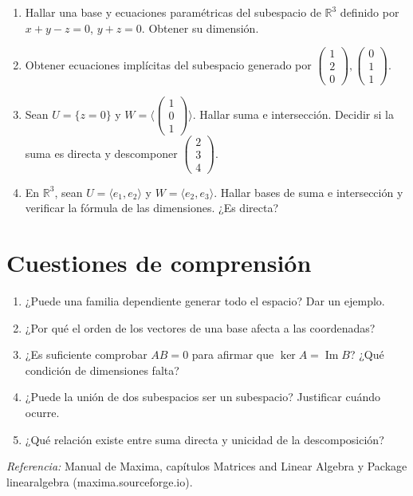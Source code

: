 \documentclass[12pt,a4paper]{article}
\begin{document}
\begin{enumerate}
\item Hallar una base y ecuaciones paramétricas del subespacio de $\mathbb R^3$ definido por $x+y-z=0$, $y+z=0$. Obtener su dimensión.
\item Obtener ecuaciones implícitas del subespacio generado por $\begin{pmatrix}1\\2\\0\end{pmatrix},\begin{pmatrix}0\\1\\1\end{pmatrix}$.
\item Sean $U=\{z=0\}$ y $W=\langle\begin{pmatrix}1\\0\\1\end{pmatrix}\rangle$. Hallar suma e intersección. Decidir si la suma es directa y descomponer $\begin{pmatrix}2\\3\\4\end{pmatrix}$.
\item En $\mathbb R^3$, sean $U=\langle e_1,e_2\rangle$ y $W=\langle e_2,e_3\rangle$. Hallar bases de suma e intersección y verificar la fórmula de las dimensiones. ¿Es directa?
\end{enumerate}
\section{Cuestiones de comprensión}
\begin{enumerate}
\item ¿Puede una familia dependiente generar todo el espacio? Dar un ejemplo.
\item ¿Por qué el orden de los vectores de una base afecta a las coordenadas?
\item ¿Es suficiente comprobar $AB=0$ para afirmar que $\ker A=\operatorname{Im}B$? ¿Qué condición de dimensiones falta?
\item ¿Puede la unión de dos subespacios ser un subespacio? Justificar cuándo ocurre.
\item ¿Qué relación existe entre suma directa y unicidad de la descomposición?
\end{enumerate}
\medskip\noindent\textit{Referencia:} Manual de Maxima, capítulos Matrices and Linear Algebra y Package linearalgebra (maxima.sourceforge.io).
\end{document}
